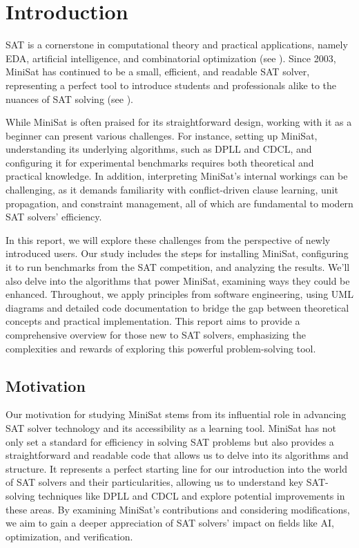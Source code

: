 \documentclass[runningheads]{llncs}
\begin{document}
\newpage
%
%
%
\section{Introduction}

\ac{SAT} is a cornerstone in computational theory and practical applications, namely \ac{EDA}, artificial intelligence, and combinatorial optimization (see \cite{sat-solver}). Since 2003, MiniSat has continued to be a small, efficient, and readable \ac{SAT} solver, representing a perfect tool to introduce students and professionals alike to the nuances of \ac{SAT} solving (see \cite{minisat}).

While MiniSat is often praised for its straightforward design, working with it as a beginner can present various challenges. For instance, setting up MiniSat, understanding its underlying algorithms, such as \ac{DPLL} and \ac{CDCL}, and configuring it for experimental benchmarks requires both theoretical and practical knowledge. In addition, interpreting MiniSat’s internal workings can be challenging, as it demands familiarity with conflict-driven clause learning, unit propagation, and constraint management, all of which are fundamental to modern \ac{SAT} solvers’ efficiency.

In this report, we will explore these challenges from the perspective of newly introduced users. Our study includes the steps for installing MiniSat, configuring it to run benchmarks from the \ac{SAT} competition, and analyzing the results. We’ll also delve into the algorithms that power MiniSat, examining ways they could be enhanced. Throughout, we apply principles from software engineering, using \ac{UML} diagrams and detailed code documentation to bridge the gap between theoretical concepts and practical implementation. This report aims to provide a comprehensive overview for those new to SAT solvers, emphasizing the complexities and rewards of exploring this powerful problem-solving tool.
 

\subsection{Motivation}

Our motivation for studying MiniSat stems from its influential role in advancing \ac{SAT} solver technology and its accessibility as a learning tool. MiniSat has not only set a standard for efficiency in solving \ac{SAT} problems but also provides a straightforward and readable code that allows us to delve into its algorithms and structure. It represents a perfect starting line for our introduction into the world of \ac{SAT} solvers and their particularities, allowing us to understand key \ac{SAT}-solving techniques like \ac{DPLL} and \ac{CDCL} and explore potential improvements in these areas. By examining MiniSat’s contributions and considering modifications, we aim to gain a deeper appreciation of SAT solvers' impact on fields like AI, optimization, and verification.
\end{document}
